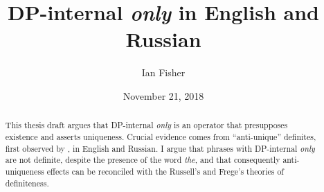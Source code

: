 \documentclass{article}
\title{DP-internal \textit{only} in English and Russian}
\author{Ian Fisher}
\date{November 21, 2018}
\begin{document}
\maketitle

\begin{abstract}
This thesis draft argues that DP-internal \textit{only} is an operator that presupposes existence and asserts uniqueness. Crucial evidence comes from ``anti-unique'' definites, first observed by \citet{cb2012b, cb2015}, in English and Russian. I argue that phrases with DP-internal \textit{only} are not definite, despite the presence of the word \textit{the}, and that consequently anti-uniqueness effects can be reconciled with the Russell's and Frege's theories of definiteness.
\end{abstract}












\end{document}
